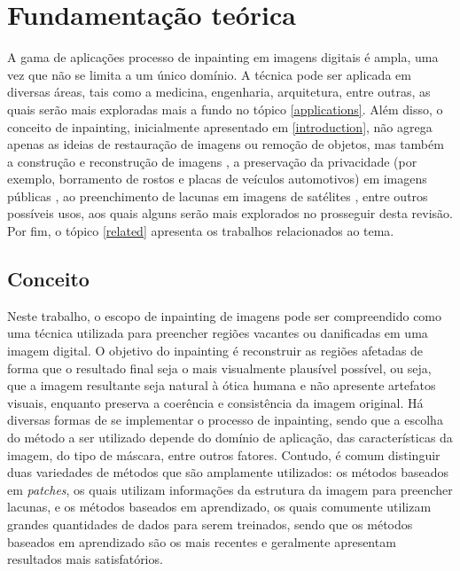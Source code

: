 
\section{Fundamentação teórica}

A gama de aplicações processo de inpainting em imagens digitais é ampla, uma vez que não se limita a um único domínio. A técnica pode ser aplicada em diversas áreas, tais como a medicina, engenharia, arquitetura, entre outras, as quais serão mais exploradas mais a fundo no tópico \ref{applications}.
Além disso, o conceito de inpainting, inicialmente apresentado em \ref{introduction}, não agrega apenas as ideias de restauração de imagens ou remoção de objetos, mas também a construção e reconstrução de imagens \cite{you2019pirec}, a preservação da privacidade (por exemplo, borramento de rostos e placas de veículos automotivos) em imagens públicas \cite{google2022magritte}, ao preenchimento de lacunas em imagens de satélites \cite{Maalouf2009bandelet}, entre outros possíveis usos, aos quais alguns serão mais explorados no prosseguir desta revisão. Por fim, o tópico \ref{related} apresenta os trabalhos relacionados ao tema. 

\subsection{Conceito} \label{theory} 
Neste trabalho, o escopo de inpainting de imagens pode ser compreendido como uma técnica utilizada para preencher regiões vacantes ou danificadas em uma imagem digital. O objetivo do inpainting é reconstruir as regiões afetadas de forma que o resultado final seja o mais visualmente plausível possível, ou seja, que a imagem resultante seja natural à ótica humana e não apresente artefatos visuais, enquanto preserva a coerência e consistência da imagem original. Há diversas formas de se implementar o processo de inpainting, sendo que a escolha do método a ser utilizado depende do domínio de aplicação, das características da imagem, do tipo de máscara, entre outros fatores. Contudo, é comum distinguir duas variedades de métodos que são amplamente utilizados: os métodos baseados em \emph{patches}, os quais utilizam informações da estrutura da imagem para preencher lacunas, e os métodos baseados em aprendizado, os quais comumente utilizam grandes quantidades de dados para serem treinados, sendo que os métodos baseados em aprendizado são os mais recentes e geralmente apresentam resultados mais satisfatórios.


